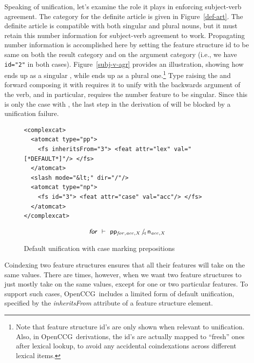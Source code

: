 \documentclass[11pt]{article}
\newcommand{\occg}{OpenCCG}
\begin{document}
Speaking of unification, let's examine the role it plays in enforcing
subject-verb agreement. The category for the definite article is given
in Figure~\ref{def-art}. The definite article is compatible with both
singular and plural nouns, but it must retain this number information
for subject-verb agreement to work. Propagating number information is
accomplished here by setting the feature structure id to be same on both
the  result category and on the argument category  (i.e.,
we have \texttt{id="2"} in both cases). Figure~\ref{subj-v-agr} provides
an illustration, showing how  ends up as a singular
, while  ends up as a plural one.\footnote{Note
that feature structure id's are only shown when relevant to unification.
Also, in \occg\ derivations, the id's are actually mapped to ``fresh''
ones after lexical lookup, to avoid any accidental coindexations across
different lexical items.} Type raising the  and forward composing
it with  requires it to unify with the backwards 
argument of the verb, and in particular, requires the number feature to
be singular. Since this is only the case with , the last
step in the derivation of  will be blocked by a
unification failure.

\begin{figure}
\begin{small}
\begin{verbatim}
<complexcat>
  <atomcat type="pp">
    <fs inheritsFrom="3"> <feat attr="lex" val="[*DEFAULT*]"/> </fs>
  </atomcat>
  <slash mode="&lt;" dir="/"/>
  <atomcat type="np">
    <fs id="3"> <feat attr="case" val="acc"/> </fs>
  </atomcat>
</complexcat>
\end{verbatim}
\end{small}
\[
\textsf{\textsl{for}} ~ \vdash ~ \mathsf{pp_{\mathit{for,acc,X}}} \, /_{\!\!\triangleleft} \, \mathsf{n_{\mathit{acc,X}}}
\]
\caption{Default unification with case marking prepositions}
\label{prep-nom}
\end{figure}

Coindexing two feature structures ensures that all their features will
take on the same values. There are times, however, when we want two
feature structures to just mostly take on the same values, except for
one or two particular features. To support such cases, \occg\ includes a
limited form of default unification, specified by the
\textsl{inheritsFrom} attribute of a feature structure element.
\end{document}
